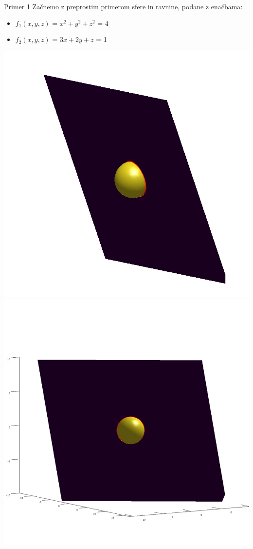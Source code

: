 \documentclass{beamer}
\begin{document}
	\begin{frame}{Primer 1}
		Začnemo z preprostim primerom sfere in ravnine, podane z enačbama:\\
		
		\begin{itemize} 
			\item $f_{1}(x,y,z)$ = $x^2 + y^2 + z^2$ = 4
			\item $f_{2}(x,y,z)$ = $3x + 2y + z$ = 1	
		\end{itemize} 
		\includegraphics[scale=0.3]{primer1_1}
		\includegraphics[scale=0.3]{primer1_2}
	\end{frame}
	
\end{document}
